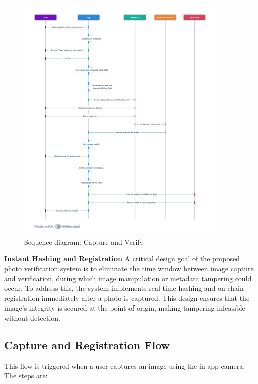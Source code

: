 \begin{figure}[htb]
    \centering
    \includegraphics[width=0.90\textwidth]{images/sequenceDiagram.png}
    \caption{Sequence diagram: Capture and Verify}
    \label{fig:sequenceDiagramofCaptureAndVerify}
\end{figure}


\textbf{Instant Hashing and Registration}
A critical design goal of the proposed photo verification system is to eliminate the time window between image capture and verification, during which image manipulation or metadata tampering could occur. To address this, the system implements real-time hashing and on-chain registration immediately after a photo is captured. This design ensures that the image’s integrity is secured at the point of origin, making tampering infeasible without detection.

\subsection{Capture and Registration Flow}
This flow is triggered when a user captures an image using the in-app camera. The steps are:


